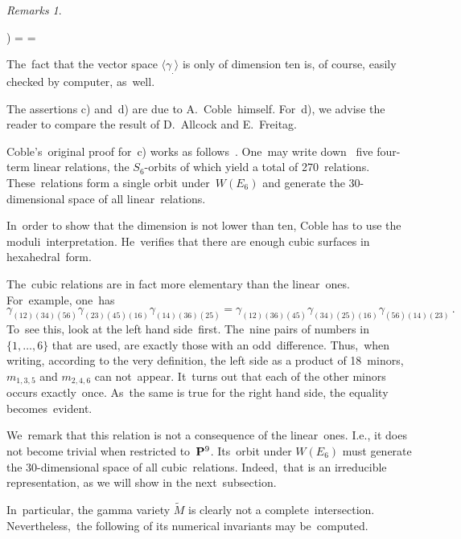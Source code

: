 \documentclass[reqno]{amsart}
\theoremstyle{definition}
\theoremstyle{remark}
\newtheorem{rems}[theorem]{Remarks}
\numberwithin{equation}{section}
\newcommand{\bP}{{\bf P}}
\newcounter{iii}
\newenvironment{iii}{\begin{list}{\rm \roman{iii}) }%
{\usecounter{iii} \leftmargin=0.0pt \labelsep=0.0pt %
\listparindent=0.0pt \labelwidth=0.0pt \parsep=\smallskipamount%
 \itemsep=0.0pt \topsep=0.0pt \partopsep=\smallskipamount}}{\end{list}}
\begin{document}
\begin{rems}\smallskip
\begin{iii}
\item
The~fact that the vector space
$\langle \gamma_. \rangle$
is only of dimension ten is, of course, easily checked by computer, as~well.
\item
The assertions c) and~d) are due to A.~Coble~himself. For~d), we advise the reader to compare the result \cite[Theorem~6.4]{AF} of D.~Allcock and E.~Frei\-tag.

Coble's~original proof for~c) works as follows~\cite[(24)]{Co3}. One~may write down~\cite[page~343]{Co3} five four-term linear relations, the
\mbox{$S_6$-orbits}
of which yield a total of 270~relations. These~relations form a single orbit
under~$W(E_6)$
and generate the 30-dimensional space of all linear~relations.

In~order to show that the dimension is not lower than ten, Coble has to use the moduli~interpretation. He~verifies that there are enough cubic surfaces in hexahedral~form.
\item
The~cubic relations are in fact more elementary than the linear~ones. For~example, one~has
$$\gamma_{(12)(34)(56)} \gamma_{(23)(45)(16)} \gamma_{(14)(36)(25)} = \gamma_{(12)(36)(45)} \gamma_{(34)(25)(16)} \gamma_{(56)(14)(23)} \, .$$
To~see this, look at the left hand side~first. The~nine pairs of numbers in
$\{1, \ldots, 6\}$
that are used, are exactly those with an odd~difference. Thus,~when writing, according to the very definition, the left side as a product of 18~minors,
$m_{1,3,5}$
and
$m_{2,4,6}$
can not~appear. It~turns out that each of the other minors occurs exactly~once. As~the same is true for the right hand side, the equality becomes~evident.

We~remark that this relation is not a consequence of the linear~ones. I.e., it does not become trivial when restricted
to~$\bP^9$.
Its~orbit under
$W(E_6)$
must generate the 30-dimensional space of all cubic~relations. Indeed,~that is an irreducible representation, as we will show in the next~subsection.
\item
In~particular, the gamma variety
$\widetilde{M}$
is clearly not a complete~intersection. Nevertheless,~the following of its numerical invariants may be~computed.
\end{iii}
\end{rems}
\end{document}
